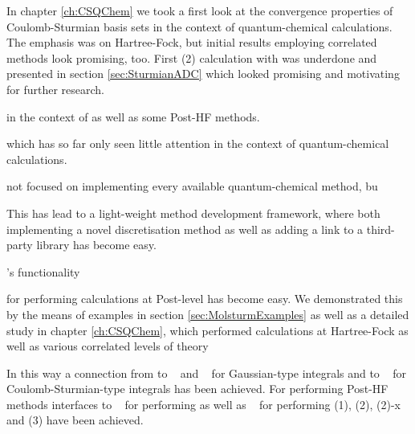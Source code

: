 In chapter \vref{ch:CSQChem} we took a first
look at the convergence properties of Coulomb-Sturmian
basis sets in the context of quantum-chemical calculations.
The emphasis was on Hartree-Fock,
but initial results employing correlated methods look promising, too.
First \ADC(2) calculation with \molsturm was underdone
and presented in section \vref{sec:SturmianADC}
which looked promising and motivating for further research.





in the context of \HF as well as some Post-HF methods.



which has so far only seen little attention in the context of quantum-chemical
calculations.

not focused on implementing every available quantum-chemical method,
bu

This has lead to a light-weight method development framework,
where both implementing a novel discretisation method
as well as adding a link to a third-party library has become easy.


\molsturm's functionality 

for performing
calculations at Post-\HF level has become easy.
We demonstrated this by the means of examples in section \vref{sec:MolsturmExamples}
as well as a detailed study in chapter \vref{ch:CSQChem},
which performed calculations
at Hartree-Fock as well as various correlated levels of theory


In this way a connection from \molsturm
to \libint~\cite{Libint2_231,Libint2} and \libcint~\cite{Sun2015}
for Gaussian-type integrals
and to \sturmint~\cite{sturmintWeb}
for Coulomb-Sturmian-type integrals has been achieved.
For performing Post-HF methods
interfaces to \pyscf~\cite{Sun2017}
for performing \FCI as well as \adcman~\cite{Wormit2014}
for performing {\ADC}(1), {\ADC}(2), {\ADC}(2)-x and {\ADC}(3)
have been achieved.

